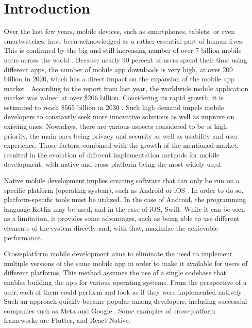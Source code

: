 
\chapter{Introduction}

Over the last few years, mobile devices, such as smartphones, tablets, or even smartwatches, have been acknowledged as a rather essential part of human lives. This is confirmed by the big and still increasing number of over 7 billion mobile users across the world \cite{statista_mobile_users_worldwide}. Because nearly 90 percent of users spend their time using different apps, the number of mobile app downloads is very high, at over 200 billion in 2020, which has a direct impact on the expansion of the mobile app market \cite{techjury_app_statistics}. According to the report from last year, the worldwide mobile application market was valued at over \$206 billion. Considering its rapid growth, it is estimated to reach \$565 billion in 2030 \cite{mobile_market_size}. Such high demand impels mobile developers to constantly seek more innovative solutions as well as improve on existing ones. Nowadays, there are various aspects considered to be of high priority, the main ones being privacy and security as well as usability and user experience. Those factors, combined with the growth of the mentioned market, resulted in the evolution of different implementation methods for mobile development, with native and cross-platform being the most widely used.

Native mobile development implies creating software that can only be run on a specific platform (operating system), such as Android or iOS \cite{cma_mobile_ecosystems_report}. In order to do so, platform-specific tools must be utilized. In the case of Android, the programming language Kotlin may be used, and in the case of iOS, Swift. While it can be seen as a limitation, it provides some advantages, such as being able to use different elements of the system directly and, with that, maximize the achievable performance.

Cross-platform mobile development aims to eliminate the need to implement multiple versions of the same mobile app in order to make it available for users of different platforms. This method assumes the use of a single codebase that enables building the app for various operating systems. From the perspective of a user, each of them could perform and look as if they were implemented natively \cite{lachgar_mcdm_cp}. Such an approach quickly became popular among developers, including successful companies such as Meta and Google \cite{kotlin_popular_cross_platform_frameworks}. Some examples of cross-platform frameworks are Flutter, and React Native.

